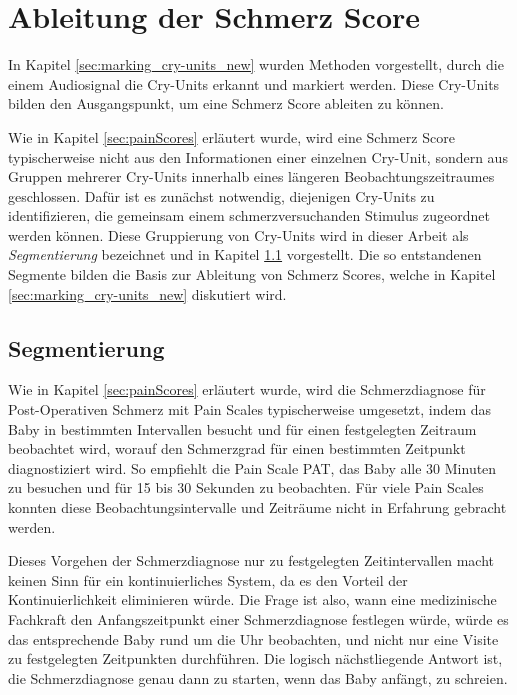 \chapter{Ableitung der Schmerz Score}

In Kapitel \ref{sec:marking_cry-units_new} wurden Methoden vorgestellt, durch die einem Audiosignal die Cry-Units erkannt und markiert werden. Diese Cry-Units bilden den Ausgangspunkt, um eine Schmerz Score ableiten zu können. 

Wie in Kapitel \ref{sec:painScores} erläutert wurde, wird eine Schmerz Score typischerweise nicht aus den Informationen einer einzelnen Cry-Unit, sondern aus Gruppen mehrerer Cry-Units innerhalb eines längeren Beobachtungszeitraumes geschlossen. Dafür ist es zunächst notwendig, diejenigen Cry-Units zu identifizieren, die gemeinsam einem schmerzversuchanden Stimulus zugeordnet werden können. Diese Gruppierung von Cry-Units wird in dieser Arbeit als \emph{Segmentierung} bezeichnet und in Kapitel \ref{sec:segmenting} vorgestellt. Die so entstandenen Segmente bilden die Basis zur Ableitung von Schmerz Scores, welche in Kapitel \ref{sec:marking_cry-units_new} diskutiert wird.


\section{Segmentierung}
\label{sec:segmenting}


Wie in Kapitel \ref{sec:painScores} erläutert wurde, wird die Schmerzdiagnose für Post-Operativen Schmerz mit Pain Scales typischerweise umgesetzt, indem das Baby in bestimmten Intervallen besucht und für einen festgelegten Zeitraum beobachtet wird, worauf den Schmerzgrad für einen bestimmten Zeitpunkt diagnostiziert wird. So empfiehlt die Pain Scale PAT, das Baby alle 30 Minuten zu besuchen und für 15 bis 30 Sekunden zu beobachten. Für viele Pain Scales konnten diese  Beobachtungsintervalle und Zeiträume nicht in Erfahrung gebracht werden. 

Dieses Vorgehen der Schmerzdiagnose nur zu festgelegten Zeitintervallen macht keinen Sinn für ein kontinuierliches System, da es den Vorteil der Kontinuierlichkeit eliminieren würde. Die Frage ist also, wann eine medizinische Fachkraft den Anfangszeitpunkt einer Schmerzdiagnose festlegen würde, würde es das entsprechende Baby rund um die Uhr beobachten, und nicht nur eine Visite zu festgelegten Zeitpunkten durchführen. Die logisch nächstliegende Antwort ist, die Schmerzdiagnose genau dann zu starten, wenn das Baby anfängt, zu schreien. 

